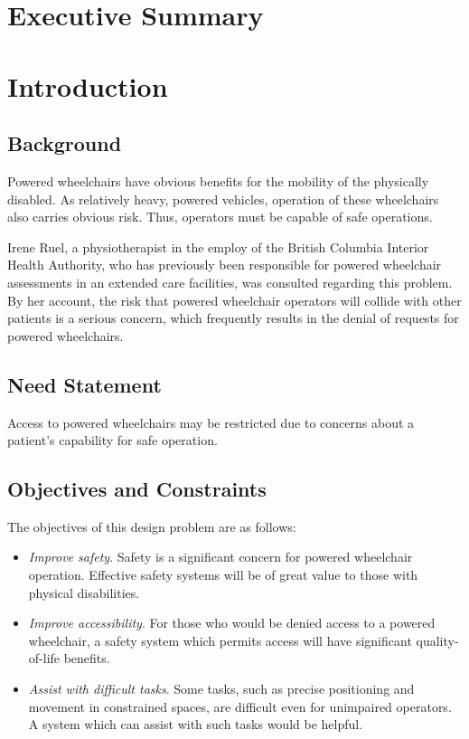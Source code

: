 \documentclass[oneside,final]{report}
\begin{document}
\chapter*{Executive Summary}

\clearpage
\setcounter{page}{1}
\pagestyle{headings}

\chapter{Introduction}

\section{Background}
Powered wheelchairs have obvious benefits for the mobility of the physically disabled.  As relatively heavy, powered vehicles, operation of these wheelchairs also carries obvious risk.  Thus, operators must be capable of safe operations.

Irene Ruel, a physiotherapist in the employ of the British Columbia Interior Health Authority, who has previously been responsible for powered wheelchair assessments in an extended care facilities, was consulted regarding this problem.  By her account, the risk that powered wheelchair operators will collide with other patients is a serious concern, which frequently results in the denial of requests for powered wheelchairs.

\section{Need Statement}
Access to powered wheelchairs may be restricted due to concerns about a patient's capability for safe operation.

\section{Objectives and Constraints}
The objectives of this design problem are as follows:

\begin{itemize}
 \item \emph{Improve safety}.  Safety is a significant concern for powered wheelchair operation.  Effective safety systems will be of great value to those with physical disabilities.
 \item \emph{Improve accessibility}.  For those who would be denied access to a powered wheelchair, a safety system which permits access will have significant quality-of-life benefits.
 \item \emph{Assist with difficult tasks}. Some tasks, such as precise positioning and movement in constrained spaces, are difficult even for unimpaired operators.   A system which can assist with such tasks would be helpful.
\end{itemize}
\end{document}
